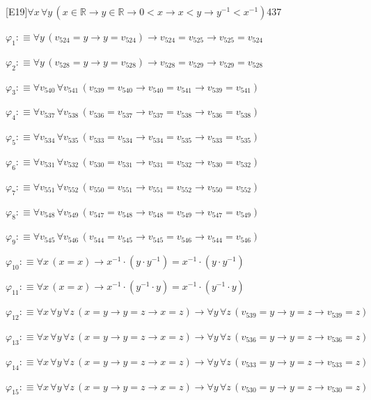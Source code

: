 \begin{fullproof}{[E19]}{$\forall x\,\forall y\,(x \in \mathbb{R} \to y \in \mathbb{R} \to 0 < x \to x < y \to y^{-1} < x^{-1})$}{437}
\begin{abbrevlist}
\item $\varphi_{1} :\equiv \forall y\,(v_{524} = y \to y = v_{524}) \to v_{524} = v_{525} \to v_{525} = v_{524}$
\item $\varphi_{2} :\equiv \forall y\,(v_{528} = y \to y = v_{528}) \to v_{528} = v_{529} \to v_{529} = v_{528}$
\item $\varphi_{3} :\equiv \forall v_{540}\,\forall v_{541}\,(v_{539} = v_{540} \to v_{540} = v_{541} \to v_{539} = v_{541})$
\item $\varphi_{4} :\equiv \forall v_{537}\,\forall v_{538}\,(v_{536} = v_{537} \to v_{537} = v_{538} \to v_{536} = v_{538})$
\item $\varphi_{5} :\equiv \forall v_{534}\,\forall v_{535}\,(v_{533} = v_{534} \to v_{534} = v_{535} \to v_{533} = v_{535})$
\item $\varphi_{6} :\equiv \forall v_{531}\,\forall v_{532}\,(v_{530} = v_{531} \to v_{531} = v_{532} \to v_{530} = v_{532})$
\item $\varphi_{7} :\equiv \forall v_{551}\,\forall v_{552}\,(v_{550} = v_{551} \to v_{551} = v_{552} \to v_{550} = v_{552})$
\item $\varphi_{8} :\equiv \forall v_{548}\,\forall v_{549}\,(v_{547} = v_{548} \to v_{548} = v_{549} \to v_{547} = v_{549})$
\item $\varphi_{9} :\equiv \forall v_{545}\,\forall v_{546}\,(v_{544} = v_{545} \to v_{545} = v_{546} \to v_{544} = v_{546})$
\item $\varphi_{10} :\equiv \forall x\,(x = x) \to x^{-1} \cdot (y \cdot y^{-1}) = x^{-1} \cdot (y \cdot y^{-1})$
\item $\varphi_{11} :\equiv \forall x\,(x = x) \to x^{-1} \cdot (y^{-1} \cdot y) = x^{-1} \cdot (y^{-1} \cdot y)$
\item $\varphi_{12} :\equiv \forall x\,\forall y\,\forall z\,(x = y \to y = z \to x = z) \to \forall y\,\forall z\,(v_{539} = y \to y = z \to v_{539} = z)$
\item $\varphi_{13} :\equiv \forall x\,\forall y\,\forall z\,(x = y \to y = z \to x = z) \to \forall y\,\forall z\,(v_{536} = y \to y = z \to v_{536} = z)$
\item $\varphi_{14} :\equiv \forall x\,\forall y\,\forall z\,(x = y \to y = z \to x = z) \to \forall y\,\forall z\,(v_{533} = y \to y = z \to v_{533} = z)$
\item $\varphi_{15} :\equiv \forall x\,\forall y\,\forall z\,(x = y \to y = z \to x = z) \to \forall y\,\forall z\,(v_{530} = y \to y = z \to v_{530} = z)$

\end{abbrevlist}
\end{fullproof}
